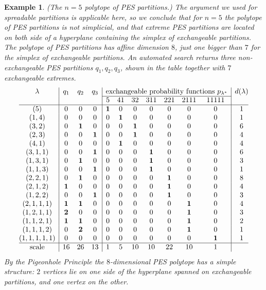 \documentclass{article}
\newtheorem{example}{Example}
\begin{document}
\begin{example}\label{Ex6}{\rm (The $n=5$ polytope of PES partitions.)
The argument we used for spreadable partitions is applicable here, so we conclude that for $n=5$ the polytope of PES partitions is not simplicial,
and that extreme PES partitions are located on both side of a hyperplane containing the simplex of exchangeable partitions.
The polytope of PES partitions has affine dimension $8$, just one bigger than $7$ for the simplex of exchangeable partitions. An automated search 
returns three non-exchangeable PES partitions $q_1, q_2, q_3$, shown in the table together with $7$ exchangeable extremes.
{\setlength{\tabcolsep}{3pt}
\[
\begin{array}{@{}c|ccc|ccccccc|c@{}}
\lambda
& q_1 & q_2 & q_3
& \multicolumn{7}{c|}{\text{exchangeable probability functions $p_{\lambda^*}$}}
& d(\lambda)\\
\cline{5-11}
& & &
& 5 & 41 & 32 & 311 & 221 & 2111 & 11111 & \\
\hline
(5)
& 0 & 0 & 0
& \mathbf{1} & 0 & 0 & 0 & 0 & 0 & 0 & 1 \\
(1,4)
& 0 & 0 & 0
& 0 & \mathbf{1} & 0 & 0 & 0 & 0 & 0 & 1 \\
(3,2)
& 0 & \mathbf{1} & 0
& 0 & 0 & \mathbf{1} & 0 & 0 & 0 & 0 & 6 \\
(2,3)
& 0 & 0 & \mathbf{1}
& 0 & 0 & \mathbf{1} & 0 & 0 & 0 & 0 & 4 \\
(4,1)
& 0 & 0 & 0
& 0 & \mathbf{1} & 0 & 0 & 0 & 0 & 0 & 4 \\
(3,1,1)
& 0 & 0 & \mathbf{1}
& 0 & 0 & 0 & \mathbf{1} & 0 & 0 & 0 & 6 \\
(1,3,1)
& 0 & \mathbf{1} & 0
& 0 & 0 & 0 & \mathbf{1} & 0 & 0 & 0 & 3 \\
(1,1,3)
& 0 & 0 & \mathbf{1}
& 0 & 0 & 0 & \mathbf{1} & 0 & 0 & 0 & 1 \\
(2,2,1)
& 0 & \mathbf{1} & 0
& 0 & 0 & 0 & 0 & \mathbf{1} & 0 & 0 & 8 \\
(2,1,2)
& \mathbf{1} & 0 & 0
& 0 & 0 & 0 & 0 & \mathbf{1} & 0 & 0 & 4 \\
(1,2,2)
& 0 & 0 & \mathbf{1}
& 0 & 0 & 0 & 0 & \mathbf{1} & 0 & 0 & 3 \\
(2,1,1,1)
& \mathbf{1} & \mathbf{1} & 0
& 0 & 0 & 0 & 0 & 0 & \mathbf{1} & 0 & 4 \\
(1,2,1,1)
& \mathbf{2} & 0 & 0
& 0 & 0 & 0 & 0 & 0 & \mathbf{1} & 0 & 3 \\
(1,1,2,1)
& \mathbf{1} & \mathbf{1} & 0
& 0 & 0 & 0 & 0 & 0 & \mathbf{1} & 0 & 2 \\
(1,1,1,2)
& 0 & \mathbf{2} & 0
& 0 & 0 & 0 & 0 & 0 & \mathbf{1} & 0 & 1 \\
(1,1,1,1,1)
& 0 & 0 & 0
& 0 & 0 & 0 & 0 & 0 & 0 & \mathbf{1} & 1 \\
\hline
\text{scale}
& 16 & 26 & 13
& 1 & 5 & 10 & 10 & 22 & 10 & 1 &
\end{array}
\]
}
By the Pigeonhole Principle the $8$-dimensional PES polytope has a simple structure: $2$  vertices lie on one side of the hyperplane spanned on exchangeable partitions,
and one vertex on the other.
}
\end{example}
\end{document}
